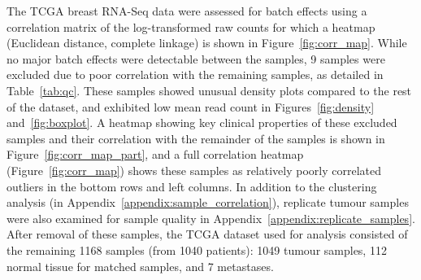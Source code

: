 The \gls{TCGA} breast \acrshort{RNA}-Seq data were assessed for batch effects using a correlation matrix of the log-transformed raw counts for which a heatmap (Euclidean distance, complete linkage) is shown in Figure~\ref{fig:corr_map}. While no major batch effects were detectable between the samples, 9 samples were excluded due to poor correlation with the remaining samples, as detailed in Table~\ref{tab:qc}. These samples showed unusual density plots compared to the rest of the dataset, and exhibited low mean read count in Figures~\ref{fig:density} and~\ref{fig:boxplot}. A heatmap showing key clinical properties of these excluded samples and their correlation with the remainder of the samples is shown in Figure~\ref{fig:corr_map_part}, and a full correlation heatmap (Figure~\ref{fig:corr_map}) shows these samples as relatively poorly correlated outliers in the bottom rows and left columns.
In addition to the clustering analysis (in Appendix~\ref{appendix:sample_correlation}), replicate tumour samples were also examined for sample quality in Appendix~\ref{appendix:replicate_samples}.
After removal of these samples, the \gls{TCGA} dataset used for analysis consisted of the remaining 1168 samples (from 1040 patients): 1049 tumour samples, 112 normal tissue for matched samples, and 7 metastases.


